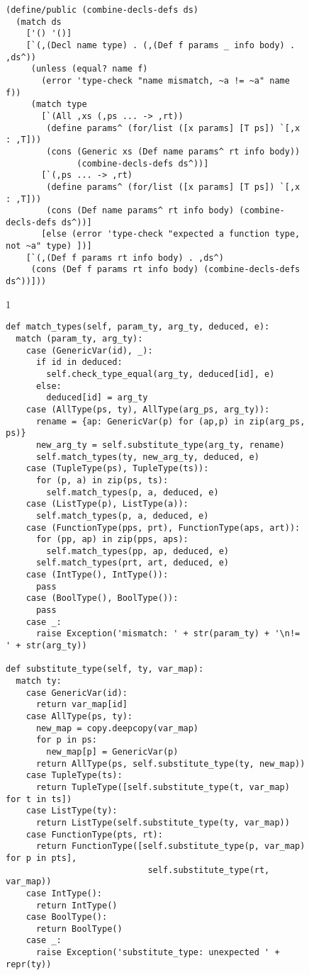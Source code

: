 \documentclass[7x10]{TimesAPriori_MIT}%
\def\pythonEd{1}
\def\edition{1}
\newcommand{\pythonColor}[0]{}
\numberwithin{theorem}{chapter}
\numberwithin{definition}{chapter}
\numberwithin{equation}{chapter}
\begin{document}
\begin{figure}[tbp]
\begin{tcolorbox}[colback=white]
{\begin{lstlisting}[basicstyle=\ttfamily\scriptsize]
(define/public (combine-decls-defs ds)
  (match ds
    ['() '()]
    [`(,(Decl name type) . (,(Def f params _ info body) . ,ds^))
     (unless (equal? name f)
       (error 'type-check "name mismatch, ~a != ~a" name f))
     (match type
       [`(All ,xs (,ps ... -> ,rt))
        (define params^ (for/list ([x params] [T ps]) `[,x : ,T]))
        (cons (Generic xs (Def name params^ rt info body))
              (combine-decls-defs ds^))]
       [`(,ps ... -> ,rt)
        (define params^ (for/list ([x params] [T ps]) `[,x : ,T]))
        (cons (Def name params^ rt info body) (combine-decls-defs ds^))]
       [else (error 'type-check "expected a function type, not ~a" type) ])]
    [`(,(Def f params rt info body) . ,ds^)
     (cons (Def f params rt info body) (combine-decls-defs ds^))]))
\end{lstlisting}
\fi}
{\if\edition\pythonEd\pythonColor
\begin{lstlisting}[basicstyle=\ttfamily\scriptsize]
def match_types(self, param_ty, arg_ty, deduced, e):
  match (param_ty, arg_ty):
    case (GenericVar(id), _):
      if id in deduced:
        self.check_type_equal(arg_ty, deduced[id], e)
      else:
        deduced[id] = arg_ty
    case (AllType(ps, ty), AllType(arg_ps, arg_ty)):
      rename = {ap: GenericVar(p) for (ap,p) in zip(arg_ps, ps)}
      new_arg_ty = self.substitute_type(arg_ty, rename)
      self.match_types(ty, new_arg_ty, deduced, e)
    case (TupleType(ps), TupleType(ts)):
      for (p, a) in zip(ps, ts):
        self.match_types(p, a, deduced, e)
    case (ListType(p), ListType(a)):
      self.match_types(p, a, deduced, e)
    case (FunctionType(pps, prt), FunctionType(aps, art)):
      for (pp, ap) in zip(pps, aps):
        self.match_types(pp, ap, deduced, e)
      self.match_types(prt, art, deduced, e)
    case (IntType(), IntType()):
      pass
    case (BoolType(), BoolType()):
      pass
    case _:
      raise Exception('mismatch: ' + str(param_ty) + '\n!= ' + str(arg_ty))

def substitute_type(self, ty, var_map):
  match ty:
    case GenericVar(id):
      return var_map[id]
    case AllType(ps, ty):
      new_map = copy.deepcopy(var_map)
      for p in ps:
        new_map[p] = GenericVar(p)
      return AllType(ps, self.substitute_type(ty, new_map))
    case TupleType(ts):
      return TupleType([self.substitute_type(t, var_map) for t in ts])
    case ListType(ty):
      return ListType(self.substitute_type(ty, var_map))
    case FunctionType(pts, rt):
      return FunctionType([self.substitute_type(p, var_map) for p in pts],
                            self.substitute_type(rt, var_map))
    case IntType():
      return IntType()
    case BoolType():
      return BoolType()
    case _:
      raise Exception('substitute_type: unexpected ' + repr(ty))


\end{lstlisting}}
\end{tcolorbox}
\end{figure}
\end{document}
